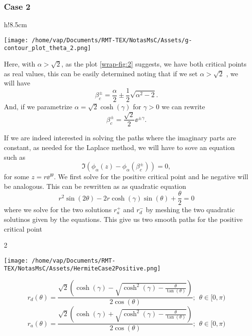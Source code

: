 \subsubsection{Case 2}

\begin{wrapfigure}{h!}{8.5cm}
	\caption{Figure for case 3}\label{wrap-fig:2}
	\texttt{[image: /home/vap/Documents/RMT-TEX/NotasMsC/Assets/g-contour\_plot\_theta\_2.png]}
\end{wrapfigure} 

Here, with $ \alpha > \sqrt{2}$, as the plot \ref{wrap-fig:2} suggests, we have both critical points as real values, this can be easily determined noting that if we set $\alpha > \sqrt{2}$ , we will have
\[ \beta_c^\pm  = \frac{\alpha}{2} \pm \frac{1}{2}\sqrt{\alpha^2 - 2}.\]
And, if we parametrize $\alpha = \sqrt{2} \cosh{(\gamma)}$ for $\gamma > 0$ we can rewrite 
\[ \beta_c^\pm = \frac{\sqrt{2}}{2} \ee^{\pm \gamma}.\]

If we are indeed interested in solving the paths where the imaginary parts are constant, as needed for the Laplace method, we will have to sove an equation such as 
\[ \Im(\phi_{\alpha}(z) - \phi_{\alpha}(\beta_c^\pm)) = 0,\] 
for some $z = r \ee^{\ii \theta}$. We first solve for the positive critical point and he negative will be analogous. This can be rewritten as  as quadratic equation 
\[ r^2 \sin{(2\theta)} - 2r \cosh{(\gamma)}\sin{(\theta)} + \frac{\theta}{2} = 0\]
where we solve for the two solutions $r_a^+$ and $r_d^-$  by meshing the two quadratic solutinos given by the equations. This give us two smooth paths for the positive critical point

\begin{multicols}{2}
	\begin{center}
		\texttt{[image: /home/vap/Documents/RMT-TEX/NotasMsC/Assets/HermiteCase2Positive.png]}
	\end{center}
	\columnbreak
	\hspace{0.2cm}
	\begin{equation*}
		r_d(\theta)  = \frac{\sqrt{2}  \left(\cosh{(\gamma)}  - \sqrt{\cosh^2{(\gamma)} - \frac{\theta}{\tan{(\theta)}} } \right)}{2\cos{(\theta)}}; \ \ \theta \in [0, \pi )
	\end{equation*}
	\begin{equation*}
		r_a(\theta)  = \frac{\sqrt{2}  \left(\cosh{(\gamma)}  + \sqrt{\cosh^2{(\gamma)} - \frac{\theta}{\tan{(\theta)}} } \right)}{2\cos{(\theta)}}; \ \ \theta \in [0, \pi )
	\end{equation*}
\end{multicols}

